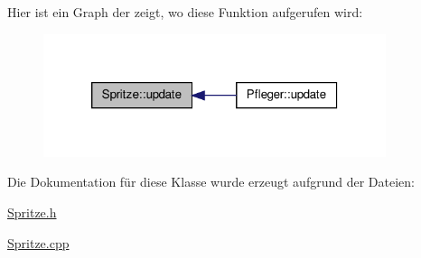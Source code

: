 Hier ist ein Graph der zeigt, wo diese Funktion aufgerufen wird\-:
\nopagebreak
\begin{figure}[H]
\begin{center}
\leavevmode
\includegraphics[width=284pt]{class_spritze_aaf70068b9356284874156f19f5237c94_icgraph}
\end{center}
\end{figure}




Die Dokumentation für diese Klasse wurde erzeugt aufgrund der Dateien\-:\begin{DoxyCompactItemize}
\item 
\hyperlink{_spritze_8h}{Spritze.\-h}\item 
\hyperlink{_spritze_8cpp}{Spritze.\-cpp}\end{DoxyCompactItemize}

